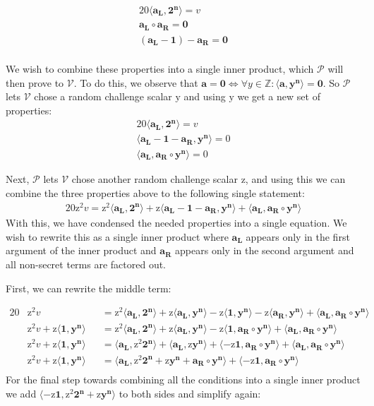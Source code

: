 \documentclass{article}
\newcommand{\eq}[1]{\begin{alignat*}{20}#1\end{alignat*}}
\renewcommand{\vec}[1]{\boldsymbol{#1}}
\newcommand{\ran}[1]{\mathrm{#1}}
\newcommand{\vecran}[1]{\mathbf{#1}}
\newcommand{\V}{\mathcal{V}}
\renewcommand{\P}{\mathcal{P}}
\newcommand{\dotp}[2]{\langle #1, #2 \rangle}
\newcommand{\opn}[1]{\operatorname{#1}}
\newcommand{\vecl}[1]{\vec{#1_{\opn{L}}}}
\newcommand{\vecr}[1]{\vec{#1_{\opn{R}}}}
\begin{document}
\eq{
	\dotp{\vecl{a}}{\vec{2^n}} = v \\
	\vecl{a}\circ \vecr{a} = \vec{0} \\
	(\vecl{a} - \vec{1}) - \vecr{a} = \vec{0} \\
}

We wish to combine these properties into a single inner product, which
$\P$ will then prove to $\V$. To do this, we observe that $\vec{a}
= \vec{0} \iff \forall y\in\mathbb{Z}: \dotp{\vec{a}}{\vec{y^n}} =
\vec{0}$. So $\P$ lets $\V$ chose a random challenge scalar $\ran{y}$
and using $\ran{y}$ we get a new set of properties:
\eq{
	\dotp{\vecl{a}}{\vec{2^n}} = v \\
	\dotp{\vecl{a} - \vec{1} - \vecr{a}}{\vecran{y}^{\vec{n}}} = 0 \\
	\dotp{\vecl{a}}{\vecr{a}\circ \vecran{y}^{\vec{n}}} = 0
}

\newpage

Next, $\P$ lets $\V$ chose another random challenge scalar $\ran{z}$,
and using this we can combine the three properties above to the
following single statement:
\eq{
	\ran{z^2}v = 
	\ran{z^2}\dotp{\vecl{a}}{\vec{2^n}} +
	\ran{z}\dotp{\vecl{a} - \vec{1} - \vecr{a}}{\vecran{y}^{\vec{n}}} +
	\dotp{\vecl{a}}{\vecr{a}\circ \vecran{y}^{\vec{n}}}
}
With this, we have condensed the needed properties into a single
equation.  We wish to rewrite this as a single inner product where
$\vecl{a}$ appears only in the first argument of the inner product
and $\vecr{a}$ appears only in the second argument and all non-secret
terms are factored out.

First, we can rewrite the middle term:

\eq{	
	&\ran{z^2}v &&= 
	\ran{z^2}\dotp{\vecl{a}}{\vec{2^n}} +
	\ran{z}\dotp{\vecl{a}}{\vecran{y}^{\vec{n}}} -
	\ran{z}\dotp{\vec{1}}{\vecran{y}^{\vec{n}}} -
	\ran{z}\dotp{\vecr{a}}{\vecran{y}^{\vec{n}}} +
	\dotp{\vecl{a}}{\vecr{a}\circ \vecran{y}^{\vec{n}}} \\
	&\ran{z^2}v + \ran{z}\dotp{\vec{1}}{\vecran{y}^{\vec{n}}} 
	&&= \ran{z^2}\dotp{\vecl{a}}{\vec{2^n}} +
	\ran{z}\dotp{\vecl{a}}{\vecran{y}^{\vec{n}}} -
	\ran{z}\dotp{\vec{1}}{\vecr{a}\circ\vecran{y}^{\vec{n}}} +
	\dotp{\vecl{a}}{\vecr{a}\circ \vecran{y}^{\vec{n}}} \\
	&\ran{z^2}v + \ran{z}\dotp{\vec{1}}{\vecran{y}^{\vec{n}}} 
	&&= \dotp{\vecl{a}}{\ran{z^2}\vec{2^n}} +
	\dotp{\vecl{a}}{\ran{z}\vecran{y}^{\vec{n}}} +
	\dotp{-\ran{z}\vec{1}}{\vecr{a}\circ\vecran{y}^{\vec{n}}} +
	\dotp{\vecl{a}}{\vecr{a}\circ \vecran{y}^{\vec{n}}} \\
	&\ran{z^2}v + \ran{z}\dotp{\vec{1}}{\vecran{y}^{\vec{n}}} 
	&&= \dotp{\vecl{a}}{\ran{z^2}\vec{2^n} + \ran{z}\vecran{y}^{\vec{n}} + \vecr{a}\circ \vecran{y}^{\vec{n}}} +
	\dotp{-\ran{z}\vec{1}}{\vecr{a}\circ\vecran{y}^{\vec{n}}} \\
}
For the final step towards combining all the conditions into a single
inner product we add $\dotp{-\ran{z}\vec{1}}{\ran{z^2}\vec{2^n} +
\ran{z}\vecran{y}^{\vec{n}}}$ to both sides and simplify again:
\end{document}
